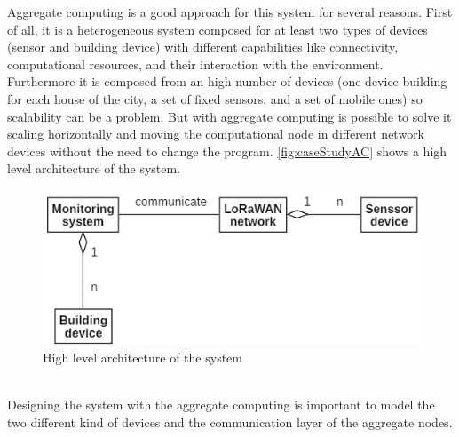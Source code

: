 Aggregate computing is a good approach for this system for several reasons.
First of all, it is a heterogeneous system composed for at least two types of devices (sensor and building device) with different capabilities like connectivity, computational resources, and their interaction with the environment. 
Furthermore it is composed from an high number of devices (one device building for each house of the city, a set of fixed sensors, and a set of mobile ones) so scalability can be a problem. But with aggregate computing is possible to solve it scaling horizontally and moving the computational node in different network devices without the need to change the program.
\autoref{fig:caseStudyAC} shows a high level architecture of the system.
\begin{figure}[h]
    \centering
    \includegraphics{figures/caseStudyB_high.png}
    \caption{High level architecture of the system}
    \label{fig:caseStudyAC}
\end{figure}
\\Designing the system with the aggregate computing is important to model the two different kind of devices and the communication layer of the aggregate nodes.

